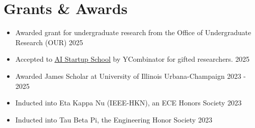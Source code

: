 \documentclass[letterpaper,10pt]{article}
\begin{document}
    
    
    \section{Grants \& Awards}
    \begin{itemize}[itemsep=-3pt, parsep=5pt, leftmargin=0.25in]
        \item Awarded grant for undergraduate research from the Office of Undergraduate Research (OUR) \hfill 2025
        \item Accepted to  \href{https://events.ycombinator.com/ai-sus}{\underline{AI Startup School}} by YCombinator for gifted researchers. \hfill 2025
        \item Awarded James Scholar at University of Illinois Urbana-Champaign \hfill 2023 - 2025
        \item Inducted into Eta Kappa Nu (IEEE-HKN), an ECE Honors Society \hfill 2023
        \item Inducted into Tau Beta Pi, the Engineering Honor Society \hfill 2023
    \end{itemize}
    
\end{document}
